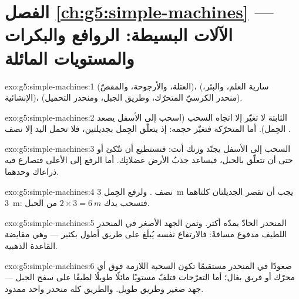 \section*{الفصل \ref{ch:g5:simple-machines} --- الآلات البسيطة: الروافع والبكرات والمستويات المائلة}

\begin{solution}{exo:g5:simple-machines:1}
 (العتلة، والأرجوحة، والمقصّ)،  (سارية العلم،
والبئر،  الإنشائية)،  (منحدر الكرسيّ
المتحرّك، وطريق الجبل، ومنحدر التحميل).
\end{solution}

\begin{solution}{exo:g5:simple-machines:2}
 الثابتة لا تغيّر إلا اتجاه السحب (اسحب إلى الأسفل يصعد
الحِمل). أما  المتحرّكة فتغيّر حجمه: إذ يتعلّق الحِمل
بجديلتين، فلا تحمل اليد إلا نصف .
\end{solution}

\begin{solution}{exo:g5:simple-machines:3}
السحب إلى الأسفل يجنّد وزنك أنت: فتستطيع أن تتّكئ أو حتى أن
تتعلّق بالحبل، فيساعد جذبُ الأرض عضلاتِك. أما الرفع إلى الأعلى
فتصارع فيه ذراعاك وحدهما.
\end{solution}

\begin{solution}{exo:g5:simple-machines:4}
نصف . ولرفع الحِمل \qty{3}{m} يجب أن تقصر الجديلتان
كلتاهما \qty{3}{m}: فتسحب يدك $2 \times 3 = \qty{6}{m}$ من
الحبل.
\end{solution}

\begin{solution}{exo:g5:simple-machines:5}
المنحدر الحادّ يمدّه أكثر. وثمن الجهد الأصغر في المنحدر اللطيف
مدفوع مسافةً: فالارتفاع نفسه يُبلَغ على طريق أطول بكثير ---
وهي مقايضة القاعدة الذهبية.
\end{solution}

\begin{solution}{exo:g5:simple-machines:6}
صعودًا في المنحدر مستقيمًا تكون السحبة اللازمة فوق  أي
محرّك أو فريق بغال؛ أما التعرّجات فتلفّ مستويًا مائلًا طويلًا
لطيفًا على سفح الجبل --- جهد صغير وطريق طويل. والطريق كله
منحدر واحد ممدود.
\end{solution}

